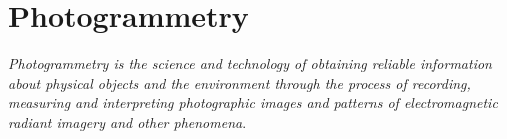 \section{Photogrammetry}
\textit{Photogrammetry is the science and technology of 
obtaining reliable information about physical objects and
the environment through the process of recording,
measuring and interpreting photographic images and patterns 
of electromagnetic radiant imagery and other 
phenomena}\cite{examplewebsite}.